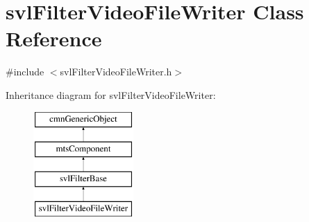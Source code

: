 \hypertarget{classsvl_filter_video_file_writer}{\section{svl\-Filter\-Video\-File\-Writer Class Reference}
\label{classsvl_filter_video_file_writer}
}


{\ttfamily \#include $<$svl\-Filter\-Video\-File\-Writer.\-h$>$}

Inheritance diagram for svl\-Filter\-Video\-File\-Writer\-:\begin{figure}[H]
\begin{center}
\leavevmode
\includegraphics[height=4.000000cm]{d4/dcc/classsvl_filter_video_file_writer}
\end{center}
\end{figure}
